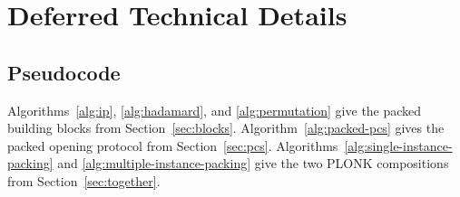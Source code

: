 \clearpage
\section{Deferred Technical Details}
\label{appx:tech}

\subsection{Pseudocode}
\label{appx:pseudocode}

Algorithms~\ref{alg:ip}, \ref{alg:hadamard}, and
\ref{alg:permutation} give the packed building blocks from
Section~\ref{sec:blocks}. Algorithm~\ref{alg:packed-pcs} gives
the packed opening protocol from Section~\ref{sec:pcs}.
Algorithms~\ref{alg:single-instance-packing} and
\ref{alg:multiple-instance-packing} give the two PLONK
compositions from Section~\ref{sec:together}.








\clearpage
